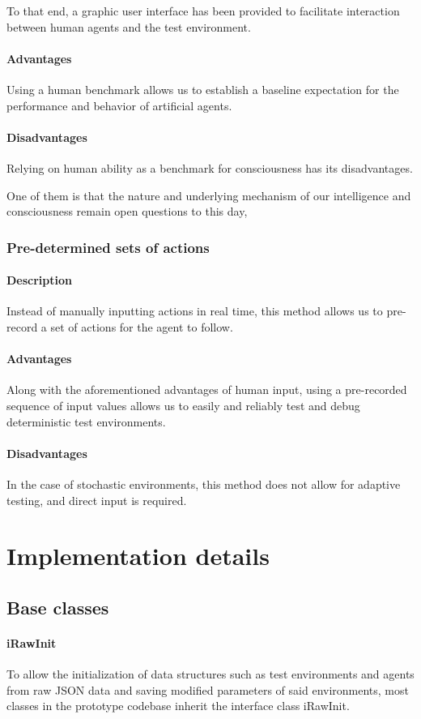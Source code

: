 \documentclass[masterthesis]{fer}
\begin{document}
To that end, a graphic user interface has been provided to facilitate interaction between human agents and the test environment.
\paragraph{Advantages}
Using a human benchmark allows us to establish a baseline expectation for the performance and behavior of artificial agents.
\paragraph{Disadvantages}
Relying on human ability as a benchmark for consciousness has its disadvantages.

One of them is that the nature and underlying mechanism of our intelligence and consciousness remain open questions to this day,
\subsubsection{Pre-determined sets of actions}

\paragraph{Description}
Instead of manually inputting actions in real time, this method allows us to pre-record a set of actions for the agent to follow.
\paragraph{Advantages}
Along with the aforementioned advantages of human input, using a pre-recorded sequence of input values allows us to easily and reliably test and debug deterministic test environments.
\paragraph{Disadvantages}
In the case of stochastic environments, this method does not allow for adaptive testing, and direct input is required.

\section{Implementation details}
\subsection{Base classes}
\paragraph{iRawInit}
To allow the initialization of data structures such as test environments and agents from raw JSON data and saving modified parameters of said environments,
most classes in the prototype codebase inherit the interface class iRawInit.
\end{document}
